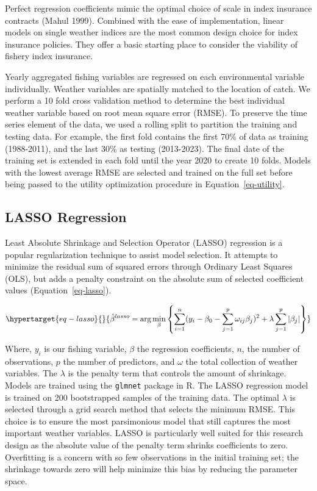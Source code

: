 \documentclass[
  letterpaper,
  DIV=11,
  numbers=noendperiod]{scrartcl}
\begin{document}
Perfect regression coefficients mimic the optimal choice of scale in
index insurance contracts (Mahul 1999). Combined with the ease of
implementation, linear models on single weather indices are the most
common design choice for index insurance policies. They offer a basic
starting place to consider the viability of fishery index insurance.

Yearly aggregated fishing variables are regressed on each environmental
variable individually. Weather variables are spatially matched to the
location of catch. We perform a 10 fold cross validation method to
determine the best individual weather variable based on root mean square
error (RMSE). To preserve the time series element of the data, we used a
rolling split to partition the training and testing data. For example,
the first fold contains the first 70\% of data as training (1988-2011),
and the last 30\% as testing (2013-2023). The final date of the training
set is extended in each fold until the year 2020 to create 10 folds.
Models with the lowest average RMSE are selected and trained on the full
set before being passed to the utility optimization procedure in
Equation~\ref{eq-utility}.

\hypertarget{lasso-regression}{%
\subsection{LASSO Regression}\label{lasso-regression}}

Least Absolute Shrinkage and Selection Operator (LASSO) regression is a
popular regularization technique to assist model selection. It attempts
to minimize the residual sum of squared errors through Ordinary Least
Squares (OLS), but adds a penalty constraint on the absolute sum of
selected coefficient values (Equation~\ref{eq-lasso}).

\begin{equation}\protect\hypertarget{eq-lasso}{}{
\hat{\beta}^{lasso}=\arg\min_{\beta}\left\{\sum_{i=1}^{n}(y_i-\beta_0-\sum_{j=1}^{p}\omega_{ij}\beta_j)^2+\lambda\sum_{j=1}^{p}|\beta_j|\right\}
}\label{eq-lasso}\end{equation}

Where, \(y_i\) is our fishing variable, \(\beta\) the regression
coefficients, \(n\), the number of observations, \(p\) the number of
predictors, and \(\omega\) the total collection of weather variables.
The \(\lambda\) is the penalty term that controls the amount of
shrinkage. Models are trained using the \texttt{glmnet} package in R.
The LASSO regression model is trained on 200 bootstrapped samples of the
training data. The optimal \(\lambda\) is selected through a grid search
method that selects the minimum RMSE. This choice is to ensure the most
parsimonious model that still captures the most important weather
variables. LASSO is particularly well suited for this research design as
the absolute value of the penalty term shrinks coefficients to zero.
Overfitting is a concern with so few observations in the initial
training set; the shrinkage towards zero will help minimize this bias by
reducing the parameter space.
\end{document}
